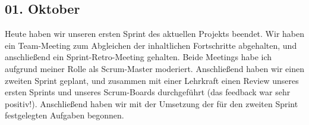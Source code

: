 \subsection{01. Oktober}
Heute haben wir unseren ersten Sprint des aktuellen Projekts beendet. Wir haben ein Team-Meeting zum Abgleichen der inhaltlichen Fortschritte abgehalten, und anschließend ein Sprint-Retro-Meeting gehalten. Beide Meetings habe ich aufgrund meiner Rolle als Scrum-Master moderiert. Anschließend haben wir einen zweiten Sprint geplant, und zusammen mit einer Lehrkraft einen Review unseres ersten Sprints und unseres Scrum-Boards durchgeführt (das feedback war sehr positiv!). Anschließend haben wir mit der Umsetzung der für den zweiten Sprint festgelegten Aufgaben begonnen.